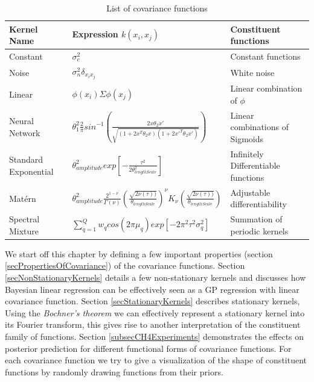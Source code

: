 \begin{table}[!ht]
    \centering
\begin{tabularx}{\textwidth}{|l|l|X|}
  \hline
Kernel Name  & Expression $k(x_{i}, x_{j})$ & Constituent functions \\
  \hline 
  \hline
Constant & \small $\sigma_{c}^2$ & Constant functions \normalsize\\
  \hline 
Noise & \small $\sigma_{n}^2\delta_{x_{i}x_{j}}$ & White noise \normalsize\\
  \hline 
Linear & \small $\phi(x_{i})\Sigma\phi(x_{j})$ & Linear combination of $\phi$ \normalsize\\
  \hline 
Neural Network & \small $\theta_{1}^{2}\frac{2}{\pi} sin^{-1}\left ( \frac{2x\theta_{2}x'}{\sqrt{(1+2x^{T}\theta_{2}x)(1+2x'^{T}\theta_{2}x')}} \right )$ & Linear combinations of Sigmoids \normalsize\\
  \hline 
Standard Exponential & \small $\theta_{amplitude}^2exp[-\frac{\tau^2}{2\theta_{lengthScale}^2}]$ & Infinitely Differentiable functions \normalsize\\ 
  \hline 
Mat\'ern & \small $\theta_{amplitude}^2\frac{2^{1- \nu }}{\Gamma (\nu)}\left ( \frac{\sqrt{2\nu(\tau))}}{\theta_{lengthScale}} \right )^{\nu}K_{\nu}\left ( \frac{\sqrt{2\nu(\tau))}}{\theta_{lengthScale}} \right)$ & Adjustable differentiability \normalsize\\
  \hline 
Spectral Mixture & \small  $\sum_{q=1}^{Q}w_{q}cos(2\pi\mu_{q}) exp[-2\pi^{2}\tau^{2}\sigma_{q}^2]$ & Summation of periodic kernels \normalsize\\
   \hline
\end{tabularx}
  \label{tabListOfCovarianceFUnctions}
  \caption{List of covariance functions}
  \end{table}
  
We start off this chapter by defining a few important properties (section \ref{secPropertiesOfCovariance}) of the covariance functions. Section \ref{secNonStationaryKernels} details a few non-stationary kernels and discusses how Bayesian linear regression can be effectively seen as a GP regression with linear covariance function. Section \ref{secStationaryKernels} describes stationary kernels, Using the \textit{Bochner's theorem} we can effectively represent a stationary kernel into its Fourier transform, this gives rise to another interpretation of the constituent family of functions. Section \ref{subsecCH4Experiments} demonstrates the effects on posterior prediction for different functional forms of covariance functions. For each covariance function we try to give a visualization of the shape of constituent functions by randomly drawing functions from their priors. 

